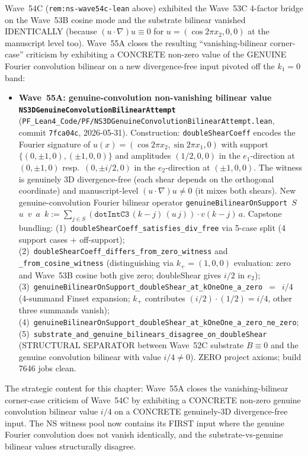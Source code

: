 \begin{remark}\label{rem:ns-wave55a-lean}
Wave~54C (\texttt{rem:ns-wave54c-lean} above) exhibited the Wave~53C 4-factor bridge on the Wave~53B cosine mode and the substrate bilinear vanished IDENTICALLY (because $(u \cdot \nabla)u \equiv 0$ for $u = (\cos 2\pi x_2, 0, 0)$ at the manuscript level too). Wave~55A closes the resulting ``vanishing-bilinear corner-case'' criticism by exhibiting a CONCRETE non-zero value of the GENUINE Fourier convolution bilinear on a new divergence-free input pivoted off the $k_1 = 0$ band:
\begin{itemize}
  \item \textbf{Wave~55A: genuine-convolution non-vanishing bilinear value \texttt{NS3DGenuineConvolutionBilinearAttempt}} (\texttt{PF\_Lean4\_Code/PF/NS3DGenuineConvolutionBilinearAttempt.lean}, commit \texttt{7fca04c}, 2026-05-31). Construction: \texttt{doubleShearCoeff} encodes the Fourier signature of $u(x) = (\cos 2\pi x_2, \sin 2\pi x_1, 0)$ with support $\{(0,\pm 1, 0), (\pm 1, 0, 0)\}$ and amplitudes $(1/2, 0, 0)$ in the $e_1$-direction at $(0, \pm 1, 0)$ resp.\ $(0, \pm i/2, 0)$ in the $e_2$-direction at $(\pm 1, 0, 0)$. The witness is genuinely 3D divergence-free (each shear depends on the orthogonal coordinate) and manuscript-level $(u \cdot \nabla)u \neq 0$ (it mixes both shears). New genuine-convolution Fourier bilinear operator \texttt{genuineBilinearOnSupport}~$S$~$u$~$v$~$a$~$k := \sum_{j \in S} (\texttt{dotIntC3}\,(k-j)\,(u\,j)) \cdot v(k-j)\,a$. Capstone bundling: (1)~\texttt{doubleShearCoeff\_satisfies\_div\_free} via 5-case split (4 support cases + off-support); (2)~\texttt{doubleShearCoeff\_differs\_from\_zero\_witness} and \texttt{\_from\_cosine\_witness} (distinguishing via $k_+ = (1,0,0)$ evaluation: zero and Wave~53B cosine both give zero; doubleShear gives $i/2$ in $e_2$); (3)~\texttt{genuineBilinearOnSupport\_doubleShear\_at\_kOneOne\_a\_zero}~$=$~$i/4$ (4-summand Finset expansion; $k_+$ contributes $(i/2) \cdot (1/2) = i/4$, other three summands vanish); (4)~\texttt{genuineBilinearOnSupport\_doubleShear\_at\_kOneOne\_a\_zero\_ne\_zero}; (5)~\texttt{substrate\_and\_genuine\_bilinears\_disagree\_on\_doubleShear} (STRUCTURAL SEPARATOR between Wave~52C substrate $B \equiv 0$ and the genuine convolution bilinear with value $i/4 \neq 0$). ZERO project axioms; build 7646 jobs clean.
\end{itemize}
The strategic content for this chapter: Wave~55A closes the vanishing-bilinear corner-case criticism of Wave~54C by exhibiting a CONCRETE non-zero genuine convolution bilinear value $i/4$ on a CONCRETE genuinely-3D divergence-free input. The NS witness pool now contains its FIRST input where the genuine Fourier convolution does not vanish identically, and the substrate-vs-genuine bilinear values structurally disagree.


\end{remark}
